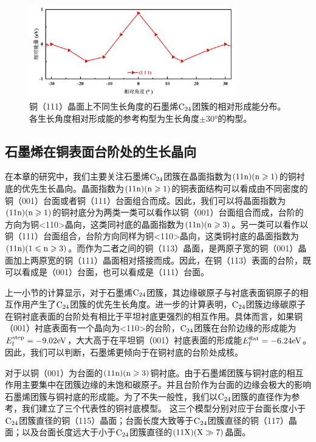         \begin{figure}[htbp]
            \includegraphics[width=0.8\textwidth]{pic/GO_C24_flat_111_energy.png}
            \caption{铜（111）晶面上不同生长角度的石墨烯$\rm{C_{24}}$团簇的相对形成能分布。各生长角度相对形成能的参考构型为生长角度$\pm 30$\si{\degree}的构型。
            }
            \label{GO_111_energy}
        \end{figure}


    \subsection{石墨烯在铜表面台阶处的生长晶向}
        在本章的研究中，我们主要关注石墨烯$\rm{C_{24}}$团簇在晶面指数为$\rm{(11n)(n \geqslant 1)}$的铜衬底的优先生长晶向。晶面指数为$\rm{(11n)(n \geqslant 1)}$的铜表面结构可以看成由不同密度的铜（001）台面或者铜（111）台面组合而成。因此，我们可以将晶面指数为$\rm{(11n)(n \geqslant 1)}$的铜衬底分为两类\chinesecolon 一类可以看作以铜（001）台面组合而成，台阶的方向为铜<110>晶向，这类同衬底的晶面指数为$\rm{(11n)(n \geqslant 3)}$。另一类可以看作以铜（111）台面组合，台阶方向同样为铜<110>晶向，这类铜衬底的晶面指数为$\rm{(11n)(1 \leqslant n \geqslant 3)}$。而作为二者之间的铜（113）晶面，是两原子宽的铜（001）晶面加上两原宽的铜（111）晶面相对搭接而成。因此，在铜（113）表面的台阶，既可以看成是（001）台面，也可以看成是（111）台面。

        上一小节的计算显示，对于石墨烯$\rm{C_{24}}$团簇，其边缘碳原子与衬底表面铜原子的相互作用产生了$\rm{C_{24}}$团簇的优先生长角度。进一步的计算表明，$\rm{C_{24}}$团簇边缘碳原子在铜衬底表面的台阶处有相比于平坦衬底更强烈的相互作用。具体而言，如果铜（001）衬底表面有一个晶向为<110>的台阶，$\rm{C_{24}}$团簇在台阶边缘的形成能为$E_{\rm f}^{\rm step}=-9.02 \si{\electronvolt}$，大大高于在平坦铜（001）衬底表面的形成能$E_{\rm f}^{\rm flat}=-6.24 \si{\electronvolt}$。因此，我们可以判断，石墨烯更倾向于在铜衬底的台阶处成核。

        对于以铜（001）为台面的$\rm{(11n)(n \geqslant 3)}$铜衬底。由于石墨烯团簇与铜衬底的相互作用主要集中在团簇边缘的未饱和碳原子。并且台阶作为台面的边缘会极大的影响石墨烯团簇与铜衬底的形成能。为了不失一般性，我们以$\rm{C_{24}}$团簇的直径作为参考，我们建立了三个代表性的铜衬底模型。
        这三个模型分别对应于台面长度小于$\rm{C_{24}}$团簇直径的铜（115）晶面；台面长度大致等于$\rm{C_{24}}$团簇直径的铜（117）晶面；以及台面长度远大于小于$\rm{C_{24}}$团簇直径的$\rm (11X)(X \gg 7 )$晶面。

